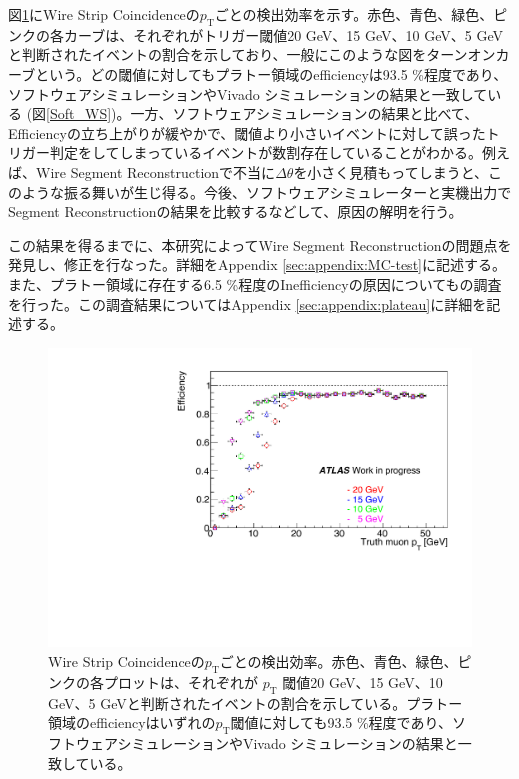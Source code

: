 図\ref{SM_A_WS_turnon}にWire Strip Coincidenceの$p_\mathrm{T}$ごとの検出効率を示す。赤色、青色、緑色、ピンクの各カーブは、それぞれがトリガー閾値20 GeV、15 GeV、10 GeV、5 GeVと判断されたイベントの割合を示しており、一般にこのような図をターンオンカーブという。どの\pt 閾値に対してもプラトー領域のefficiencyは93.5 \%程度であり、ソフトウェアシミュレーションやVivado シミュレーションの結果と一致している (図\ref{Soft_WS})。一方、ソフトウェアシミュレーションの結果と比べて、Efficiencyの立ち上がりが緩やかで、\pt 閾値より小さいイベントに対して誤ったトリガー判定をしてしまっているイベントが数割存在していることがわかる。例えば、Wire Segment Reconstructionで不当に$\Delta\theta$を小さく見積もってしまうと、このような振る舞いが生じ得る。今後、ソフトウェアシミュレーターと実機出力でSegment Reconstructionの結果を比較するなどして、原因の解明を行う。

この結果を得るまでに、本研究によってWire Segment Reconstructionの問題点を発見し、修正を行なった。詳細をAppendix \ref{sec:appendix:MC-test}に記述する。また、プラトー領域に存在する6.5 \%程度のInefficiencyの原因についてもの調査を行った。この調査結果についてはAppendix \ref{sec:appendix:plateau}に詳細を記述する。

\begin{figure} 
\centering
\includegraphics[width=16cm]{fig/Test/A_SM_ws_turn.pdf}   
\caption[]{Wire Strip Coincidenceの$p_\mathrm{T}$ごとの検出効率。赤色、青色、緑色、ピンクの各プロットは、それぞれが $p_{\mathrm{T}}$ 閾値20 GeV、15 GeV、10 GeV、5 GeVと判断されたイベントの割合を示している。プラトー領域のefficiencyはいずれの$p_{\mathrm{T}}$閾値に対しても93.5 \%程度であり、ソフトウェアシミュレーションやVivado シミュレーションの結果と一致している。}
\label{SM_A_WS_turnon}
\end{figure}

